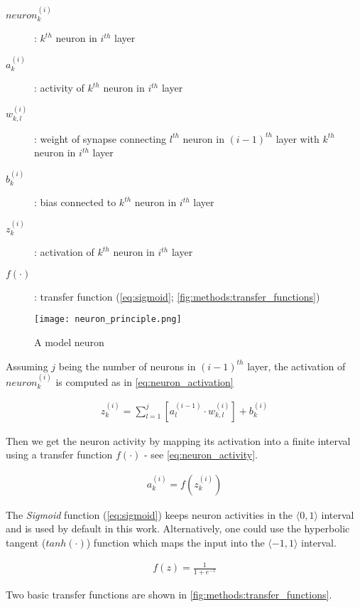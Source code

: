 \begin{description}
\item[$ neuron_k^{(i)} $] : $ k^{th} $ neuron in $ i^{th} $ layer
\item[$ a_k^{(i)} $] : activity of $ k^{th} $ neuron in $ i^{th} $ layer
\item[$ w_{k,l}^{(i)} $] : weight of synapse connecting $ l^{th} $ neuron in $ (i-1)^{th} $ layer with $ k^{th} $ neuron in $ i^{th} $ layer
\item[$ b_k^{(i)} $] : bias connected to $ k^{th} $ neuron in $ i^{th} $ layer
\item[$ z_k^{(i)} $] : activation of $ k^{th} $ neuron in $ i^{th} $ layer
\item[$ f(\cdot) $] : transfer function (\cref{eq:sigmoid}; \cref{fig:methods:transfer_functions})
\end{description}

\begin{figure}[H]
  \centering
  \texttt{[image: neuron\_principle.png]}
  \caption{A model neuron}
  \label{fig:methods:model_neuron}
\end{figure}

Assuming $ j $ being the number of neurons in $ (i-1)^{th} $ layer, the activation of $ neuron_k^{(i)} $ is computed as in \cref{eq:neuron_activation}

\begin{align} \label{eq:neuron_activation}
z_k^{(i)} = \displaystyle{\sum_{l=1}^{j} [a_l^{(i-1)} \cdot w_{k,l}^{(i)}]} + b_k^{(i)}
\end{align}

Then we get the neuron activity by mapping its activation into a finite interval using a transfer function $ f(\cdot) $ - see \cref{eq:neuron_activity}. 

\begin{align} \label{eq:neuron_activity}
a_k^{(i)} = f(z_k^{(i)})
\end{align}

The \textit{Sigmoid} function (\cref{eq:sigmoid}) keeps neuron activities in the $ \langle0, 1\rangle $ interval and is used by default in this work. Alternatively, one could use the hyperbolic tangent ($ tanh(\cdot) $) function which maps the input into the $ \langle-1, 1\rangle $ interval.

\begin{align} \label{eq:sigmoid}
f(z) = \frac{1}{1 + e^{-z}}
\end{align}

Two basic transfer functions are shown in \cref{fig:methods:transfer_functions}.

